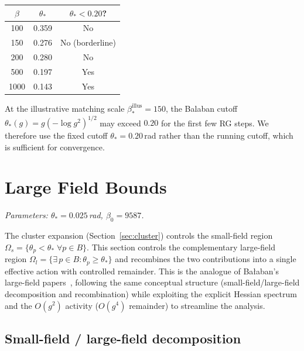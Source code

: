 \documentclass[11pt]{article}
\theoremstyle{definition}
\begin{document}
\begin{center}
\begin{tabular}{ccc}
\toprule
$\beta$ & $\theta_*$ & $\theta_*<0.20$?\\
\midrule
100 & 0.359 & No\\
150 & 0.276 & No (borderline)\\
200 & 0.280 & No\\
500 & 0.197 & Yes\\
1000 & 0.143 & Yes\\
\bottomrule
\end{tabular}
\end{center}
At the illustrative matching scale $\beta_*^{\mathrm{illus}}=150$, the Balaban cutoff
$\theta_*(g)=g(-\log g^2)^{1/2}$ may exceed $0.20$ for the first few
RG steps.  We therefore use the fixed cutoff
$\theta_*=0.20$\,rad rather than the running cutoff, which is
sufficient for convergence.

\section{Large Field Bounds}\label{sec:largefield}

\noindent\emph{Parameters: $\theta_*=0.025$\,rad,
$\beta_0=9587$.}

\medskip
The cluster expansion (Section~\ref{sec:cluster}) controls the small-field
region $\Omega_s=\{\theta_p<\theta_*\;\forall p\in B\}$.  This section
controls the complementary large-field region
$\Omega_l=\{\exists\,p\in B:\theta_p\ge\theta_*\}$ and recombines the
two contributions into a single effective action with controlled remainder.
This is the analogue of Ba\l aban's large-field papers~\cite{BalabanLF1,BalabanLF2},
following the same conceptual structure (small-field/large-field
decomposition and recombination) while exploiting the explicit
Hessian spectrum and the $O(g^2)$ activity ($O(g^4)$ remainder)
to streamline the analysis.

\subsection{Small-field / large-field decomposition}
\end{document}
